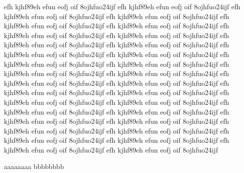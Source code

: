 \documentclass[a4paper,12pt]{book} %
\begin{document}
efh kjhf89eh efun eofj oif 8ojhfuo24ijf
efh kjhf89eh efun eofj oif 8ojhfuo24ijf
efh kjhf89eh efun eofj oif 8ojhfuo24ijf
efh kjhf89eh efun eofj oif 8ojhfuo24ijf
efh kjhf89eh efun eofj oif 8ojhfuo24ijf
efh kjhf89eh efun eofj oif 8ojhfuo24ijf
efh kjhf89eh efun eofj oif 8ojhfuo24ijf
efh kjhf89eh efun eofj oif 8ojhfuo24ijf
efh kjhf89eh efun eofj oif 8ojhfuo24ijf
efh kjhf89eh efun eofj oif 8ojhfuo24ijf
efh kjhf89eh efun eofj oif 8ojhfuo24ijf
efh kjhf89eh efun eofj oif 8ojhfuo24ijf
efh kjhf89eh efun eofj oif 8ojhfuo24ijf
efh kjhf89eh efun eofj oif 8ojhfuo24ijf
efh kjhf89eh efun eofj oif 8ojhfuo24ijf
efh kjhf89eh efun eofj oif 8ojhfuo24ijf
efh kjhf89eh efun eofj oif 8ojhfuo24ijf
efh kjhf89eh efun eofj oif 8ojhfuo24ijf
efh kjhf89eh efun eofj oif 8ojhfuo24ijf
efh kjhf89eh efun eofj oif 8ojhfuo24ijf
efh kjhf89eh efun eofj oif 8ojhfuo24ijf
efh kjhf89eh efun eofj oif 8ojhfuo24ijf
efh kjhf89eh efun eofj oif 8ojhfuo24ijf
efh kjhf89eh efun eofj oif 8ojhfuo24ijf
efh kjhf89eh efun eofj oif 8ojhfuo24ijf
efh kjhf89eh efun eofj oif 8ojhfuo24ijf
efh kjhf89eh efun eofj oif 8ojhfuo24ijf
efh kjhf89eh efun eofj oif 8ojhfuo24ijf
efh kjhf89eh efun eofj oif 8ojhfuo24ijf
efh kjhf89eh efun eofj oif 8ojhfuo24ijf
efh kjhf89eh efun eofj oif 8ojhfuo24ijf
efh kjhf89eh efun eofj oif 8ojhfuo24ijf


\listoftables{} %

\listoffigures{} %

\begin{thebibliography}{99}
  aaaaaaaa
  bbbbbbbb 
\end{thebibliography}
\end{document}
